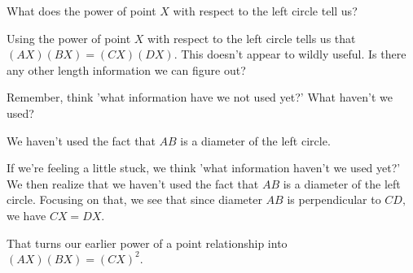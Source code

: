What does the power of point $X$ with respect to the left circle tell us?












Using the power of point $X$ with respect to the left circle tells us that $(AX)(BX) = (CX)(DX).$ This doesn't appear to wildly useful. Is there any other length information we can figure out?

Remember, think 'what information have we not used yet?'  What haven't we used?


We haven't used the fact that $AB$ is a diameter of the left circle.

If we're feeling a little stuck, we think 'what information haven't we used yet?'  We then realize that we haven't used the fact that $AB$ is a diameter of the left circle. Focusing on that, we see that since diameter $AB$ is perpendicular to $CD,$ we have $CX = DX.$

That turns our earlier power of a point relationship into $(AX)(BX) = (CX)^2.$

